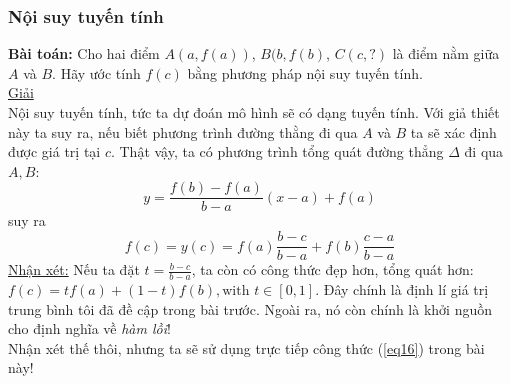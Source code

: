 \documentclass{article}
\begin{document}
\subsubsection*{Nội suy tuyến tính}
\textbf{Bài toán:} Cho hai điểm $A(a,f(a))$, $B(b, f(b)$, $C(c,?)$ là điểm nằm giữa $A$ và $B$. Hãy ước tính $f(c)$ bằng phương pháp nội suy tuyến tính.\\
\underline{Giải}\\
Nội suy tuyến tính, tức ta dự đoán mô hình sẽ có dạng tuyến tính. Với giả thiết này ta suy ra, nếu biết phương trình đường thằng đi qua $A$ và $B$ ta sẽ xác định được giá trị tại $c$. Thật vậy, ta có phương trình tổng quát đường thẳng $\Delta$ đi qua $A, B$:
$$y = \frac{f(b)-f(a)}{b-a}(x-a)+f(a)$$
suy ra \begin{equation}
    f(c) = y(c) = f(a)\frac{b-c}{b-a}+f(b)\frac{c-a}{b-a}
    \label{eq16}
\end{equation}
\underline{Nhận xét:} Nếu ta đặt $t = \frac{b-c}{b-a}$, ta còn có công thức đẹp hơn, tổng quát hơn: $f(c) = tf(a)+(1-t)f(b), \text{with }t \in [0,1]$. Đây chính là định lí giá trị trung bình tôi đã đề cập trong bài trước. Ngoài ra, nó còn chính là khởi nguồn cho định nghĩa về \textit{hàm lồi}!\\
Nhận xét thế thôi, nhưng ta sẽ sử dụng trực tiếp công thức (\ref{eq16}) trong bài này!
\end{document}
